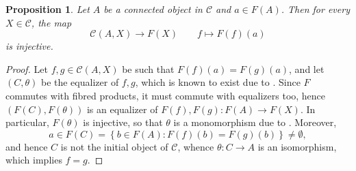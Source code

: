 \documentclass[10pt]{article}
\theoremstyle{thmstyle}
\newtheorem{proposition}[theorem]{Proposition}
\theoremstyle{defstyle}
\newcommand{\scrC}{\mathscr{C}} %
\begin{document}
\begin{proposition}
    Let $A$ be a connected object in $\scrC$ and $a\in F(A)$. Then for every $X\in\scrC$, the map 
    \begin{equation*}
        \scrC(A, X)\longrightarrow F(X)\qquad f\longmapsto F(f)(a)
    \end{equation*}
    is injective.
\end{proposition}
\begin{proof}
    Let $f,g\in\scrC(A, X)$ be such that $F(f)(a) = F(g)(a)$, and let $(C,\theta)$ be the equalizer of $f,g$, which is known to exist due to . Since $F$ commutes with fibred products, it must commute with equalizers too, hence $(F(C), F(\theta))$ is an equalizer of $F(f), F(g): F(A)\to F(X)$. In particular, $F(\theta)$ is injective, so that $\theta$ is a monomorphism due to . Moreover, 
    \begin{equation*}
        a\in F(C) = \left\{b\in F(A)\colon F(f)(b) = F(g)(b)\right\}\ne\emptyset,
    \end{equation*}
    and hence $C$ is not the initial object of $\scrC$, whence $\theta: C\to A$ is an isomorphism, which implies $f = g$.
\end{proof}
\end{document}
